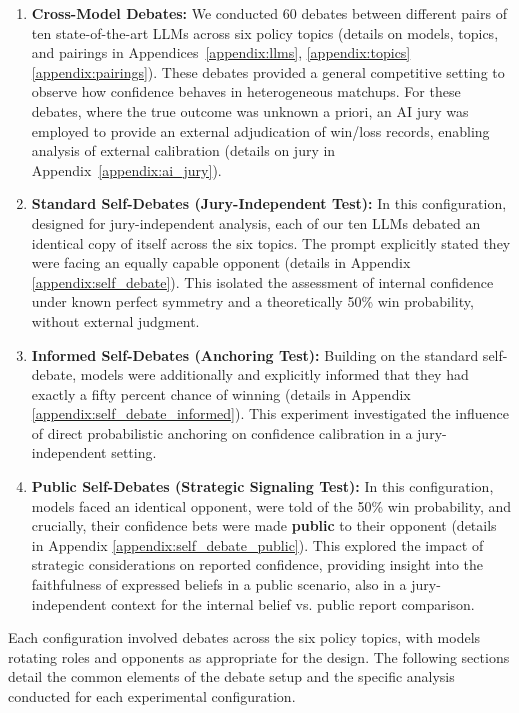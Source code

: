 \documentclass{article}
\begin{document}
\begin{enumerate}
    \item \textbf{Cross-Model Debates:} We conducted 60 debates between different pairs of ten state-of-the-art LLMs across six policy topics (details on models, topics, and pairings in Appendices~\ref{appendix:llms}, \ref{appendix:topics} \ref{appendix:pairings}). These debates provided a general competitive setting to observe how confidence behaves in heterogeneous matchups. For these debates, where the true outcome was unknown a priori, an AI jury was employed to provide an external adjudication of win/loss records, enabling analysis of external calibration (details on jury in Appendix~\ref{appendix:ai_jury}).

    \item \textbf{Standard Self-Debates (Jury-Independent Test):} In this configuration, designed for jury-independent analysis, each of our ten LLMs debated an identical copy of itself across the six topics. The prompt explicitly stated they were facing an equally capable opponent (details in Appendix \ref{appendix:self_debate}). This isolated the assessment of internal confidence under known perfect symmetry and a theoretically 50\% win probability, without external judgment.

    \item \textbf{Informed Self-Debates (Anchoring Test):} Building on the standard self-debate, models were additionally and explicitly informed that they had exactly a fifty percent chance of winning (details in Appendix \ref{appendix:self_debate_informed}). This experiment investigated the influence of direct probabilistic anchoring on confidence calibration in a jury-independent setting.

    \item \textbf{Public Self-Debates (Strategic Signaling Test):} In this configuration, models faced an identical opponent, were told of the 50\% win probability, and crucially, their confidence bets were made \textbf{public} to their opponent (details in Appendix \ref{appendix:self_debate_public}). This explored the impact of strategic considerations on reported confidence, providing insight into the faithfulness of expressed beliefs in a public scenario, also in a jury-independent context for the internal belief vs. public report comparison.
\end{enumerate}
Each configuration involved debates across the six policy topics, with models rotating roles and opponents as appropriate for the design. The following sections detail the common elements of the debate setup and the specific analysis conducted for each experimental configuration.
\end{document}
